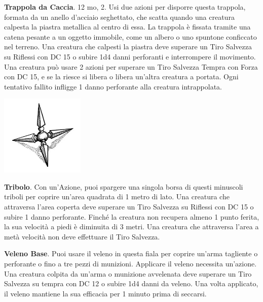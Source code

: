 \begin{multicols}{2}
\textbf{Trappola da Caccia}\hypertarget{Trappola da Caccia}{}\label{Trappola da Caccia}. 12 mo, 2. Usi due azioni per disporre questa trappola, formata da un anello d'acciaio seghettato, che scatta quando una creatura calpesta la piastra metallica al centro di essa. La trappola è fissata tramite una catena pesante a un oggetto immobile, come un albero o uno spuntone conficcato nel terreno. Una creatura che calpesti la piastra deve superare un Tiro Salvezza su Riflessi con DC 15 o subire 1d4 danni perforanti e interrompere il movimento. Una creatura può usare 2 azioni per superare un Tiro Salvezza Tempra con Forza con DC 15, e se la riesce si libera o libera un'altra creatura a portata. Ogni tentativo fallito infligge 1 danno perforante alla creatura intrappolata.


\begin{center}
\includegraphics[width=0.3\textwidth]{immagini/tribolo.png}
\end{center}



\textbf{Tribolo}\label{Tribolo}\hypertarget{Tribolo}{}. Con un'Azione, puoi spargere una singola borsa di questi minuscoli triboli per coprire un'area quadrata di 1 metro di lato. Una creatura che attraversa l'area coperta deve superare un Tiro Salvezza su Riflessi con DC 15 o subire 1 danno perforante. Finché la creatura non recupera almeno 1 punto ferita, la sua velocità a piedi è diminuita di 3 metri. Una creatura che attraversa l'area a metà velocità non deve effettuare il Tiro Salvezza.

\textbf{Veleno Base}\label{Veleno Base}. Puoi usare il veleno in questa fiala per coprire un'arma tagliente o perforante o fino a tre pezzi di munizioni. Applicare il veleno necessita un'azione. Una creatura colpita da un'arma o munizione avvelenata deve superare un Tiro Salvezza su tempra con DC 12 o subire 1d4 danni da veleno.
Una volta applicato, il veleno mantiene la sua efficacia per 1 minuto prima di seccarsi.


\end{multicols}
